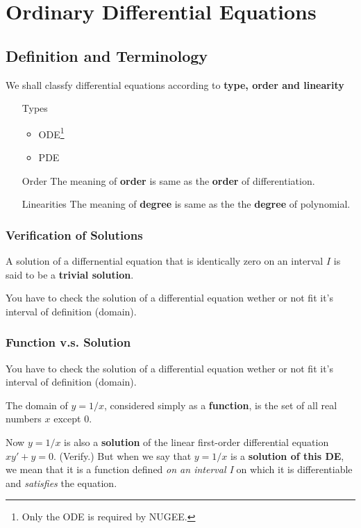 \chapter{Ordinary Differential Equations}
\section{Definition and Terminology} \label{def-de}
We shall classfy differential equations according to 
\textbf{type, order and linearity}

\begin{itemize}
    \item[Types]
        \begin{itemize}
            \item ODE\footnote{Only the ODE is required by NUGEE.}
            \item PDE
        \end{itemize}
    \item[Order]
        The meaning of \textbf{order} is same as the 
        \textbf{order} of differentiation.
    \item[Linearities]
        The meaning of \textbf{degree} is same as the 
        the \textbf{degree} of polynomial.
\end{itemize}

\subsection{Verification of Solutions}

A solution of a differnential equation that is identically zero
on an interval $I$ is said to be a \textbf{trivial solution}.

You have to check the solution of a differential equation wether
or not fit it's interval of definition (domain).

\subsection{Function v.s. Solution}

You have to check the solution of a differential equation wether
or not fit it's interval of definition (domain).

The domain of $y = 1/x$, considered simply as a \textbf{function}, 
is the set of all real numbers $x$ except $0$. 

Now $y = 1/x$ is also a \textbf{solution} 
of the linear first-order differential equation
$xy' + y = 0$. (Verify.) But when we say that $y = 1/x$ 
is a \textbf{solution of this DE}, we
mean that it is a function defined 
\emph{on an interval I} on which it is differentiable and
\emph{satisfies} the equation\cite{fcde}.

